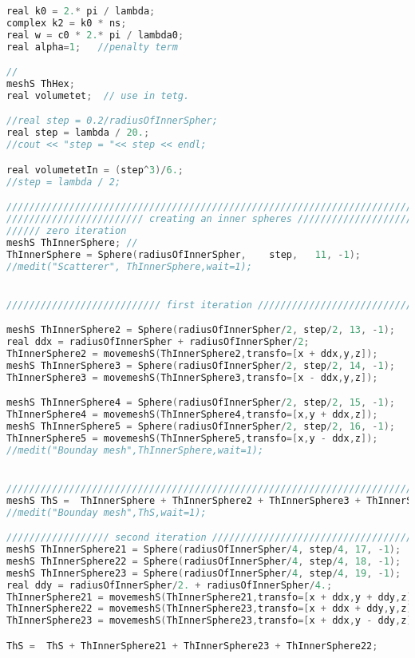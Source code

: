 \begin{lstlisting}[language=C]
real k0 = 2.* pi / lambda;
complex k2 = k0 * ns;
real w = c0 * 2.* pi / lambda0;
real alpha=1; 	//penalty term

// 
meshS ThHex;
real volumetet;  // use in tetg.

//real step = 0.2/radiusOfInnerSpher;
real step = lambda / 20.;
//cout << "step = "<< step << endl;

real volumetetIn = (step^3)/6.;  
//step = lambda / 2;

////////////////////////////////////////////////////////////////////////////
//////////////////////// creating an inner spheres //////////////////////////////////
////// zero iteration
meshS ThInnerSphere; //
ThInnerSphere = Sphere(radiusOfInnerSpher,    step,   11, -1);
//medit("Scatterer", ThInnerSphere,wait=1);


/////////////////////////// first iteration ///////////////////////////////////////////////////

meshS ThInnerSphere2 = Sphere(radiusOfInnerSpher/2, step/2, 13, -1);
real ddx = radiusOfInnerSpher + radiusOfInnerSpher/2;
ThInnerSphere2 = movemeshS(ThInnerSphere2,transfo=[x + ddx,y,z]);
meshS ThInnerSphere3 = Sphere(radiusOfInnerSpher/2, step/2, 14, -1);
ThInnerSphere3 = movemeshS(ThInnerSphere3,transfo=[x - ddx,y,z]);

meshS ThInnerSphere4 = Sphere(radiusOfInnerSpher/2, step/2, 15, -1);
ThInnerSphere4 = movemeshS(ThInnerSphere4,transfo=[x,y + ddx,z]);
meshS ThInnerSphere5 = Sphere(radiusOfInnerSpher/2, step/2, 16, -1);
ThInnerSphere5 = movemeshS(ThInnerSphere5,transfo=[x,y - ddx,z]);
//medit("Bounday mesh",ThInnerSphere,wait=1);


/////////////////////////////////////////////////////////////////////////////
meshS ThS =  ThInnerSphere + ThInnerSphere2 + ThInnerSphere3 + ThInnerSphere4 + ThInnerSphere5;
//medit("Bounday mesh",ThS,wait=1);

////////////////// second iteration //////////////////////////////////////////////////////////
meshS ThInnerSphere21 = Sphere(radiusOfInnerSpher/4, step/4, 17, -1);
meshS ThInnerSphere22 = Sphere(radiusOfInnerSpher/4, step/4, 18, -1);
meshS ThInnerSphere23 = Sphere(radiusOfInnerSpher/4, step/4, 19, -1);
real ddy = radiusOfInnerSpher/2. + radiusOfInnerSpher/4.;
ThInnerSphere21 = movemeshS(ThInnerSphere21,transfo=[x + ddx,y + ddy,z]);
ThInnerSphere22 = movemeshS(ThInnerSphere23,transfo=[x + ddx + ddy,y,z]);
ThInnerSphere23 = movemeshS(ThInnerSphere23,transfo=[x + ddx,y - ddy,z]);

ThS =  ThS + ThInnerSphere21 + ThInnerSphere23 + ThInnerSphere22;



\end{lstlisting}
